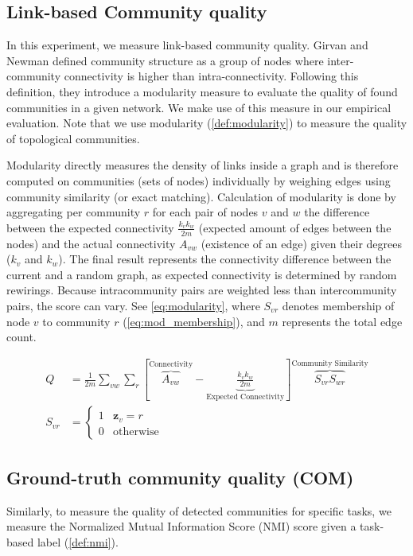 \subsection{Link-based Community quality}
In this experiment, we measure link-based community quality.
Girvan and Newman \cite{girvanCommunityStructureSocial2002} defined community structure as a group of nodes where inter-community connectivity is higher than intra-connectivity. 
Following this definition, they introduce a modularity measure to evaluate the quality of found communities in a given network. We make use of this measure in our empirical evaluation. Note that we use modularity (\cref{def:modularity}) to measure the quality of topological communities. 

\begin{secDefinition}\label{def:modularity}
Modularity directly measures the density of links inside a graph and is therefore computed on communities (sets of nodes) individually by weighing edges using community similarity (or exact matching). 
Calculation of modularity is done by aggregating per community $r$ for each pair of nodes $v$ and $w$ the difference between the expected connectivity $\frac{k_{v} k_{w}}{2 m}$ (expected amount of edges between the nodes) and the actual connectivity $A_{vw}$ (existence of an edge) given their degrees ($k_v$ and $k_w$). 
The final result represents the connectivity difference between the current and a random graph, as expected connectivity is determined by random rewirings. 
Because intracommunity pairs are weighted less than intercommunity pairs, the score can vary. 
See \cref{eq:modularity}, where $S_{vr}$ denotes membership of node $v$ to community $r$ (\cref{eq:mod_membership}), and $m$ represents the total edge count.

\begin{align}
    Q &=\frac{1}{2 m}\sum_{v w}\sum_{r}\left[\overbrace{A_{v w}}^{\text{Connectivity}}-\underbrace{\frac{k_{v} k_{w}}{2 m}}_{\text{Expected Connectivity}}\right] \overbrace{S_{v r} S_{w r}}^{\text{Community Similarity}} \label{eq:modularity} \\
    S_{vr} &= \begin{cases}
        1 & \mathbf{z}_v = r \\
        0 & \text{otherwise}
    \end{cases} \label{eq:mod_membership}
\end{align}
\end{secDefinition}

\subsection{Ground-truth community quality (COM)}
Similarly, to measure the quality of detected communities for specific tasks, we measure the Normalized Mutual Information Score (NMI) score given a task-based label (\cref{def:nmi}).

